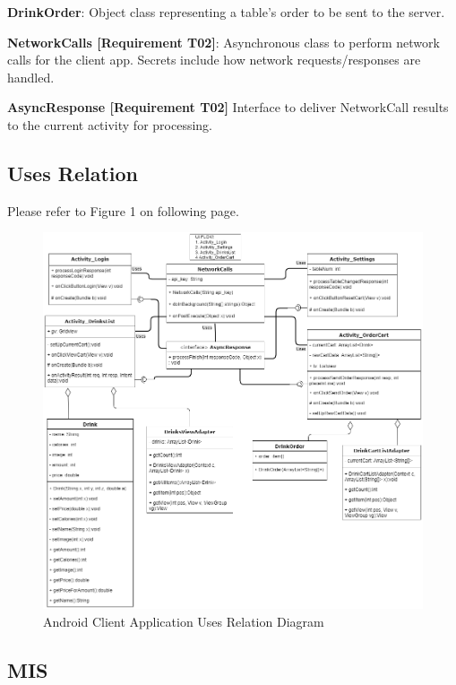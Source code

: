 \documentclass [10pt]{article}
\begin{document}
\textbf{DrinkOrder}: Object class representing a table's order to be sent to the server. 

\textbf{NetworkCalls [Requirement T02]}: Asynchronous class to perform network calls for the client app. Secrets include how network requests/responses are handled.

\textbf{AsyncResponse [Requirement T02]} Interface to deliver NetworkCall results to the current activity for processing.


\subsection{Uses Relation}

Please refer to Figure 1 on following page.

\begin{figure} [h!]
	\centering
	\includegraphics [scale = 0.4] {figures/Client_UsesDiagram.png}
	\caption{Android Client Application Uses Relation Diagram}
\end{figure}



\subsection{MIS}
\end{document}
